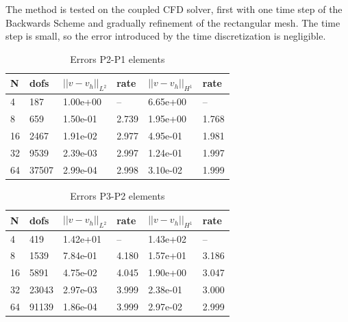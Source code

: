 The method is tested on the coupled CFD solver, first with one time step of the Backwards Scheme and gradually refinement of the rectangular mesh. The time step is small, so the error introduced by the time discretization is negligible.
\begin{table}[!ht]
  \begin{center}
  \begin{tabular}{l | l | l | l | l | l}
    N & dofs &  $||v-v_h||_{L^2}$ & rate & $||v-v_h||_{H^1}$ & rate \\ \hline
     4 &    187 & 1.00e+00 & -- & 6.65e+00 & -- \\ \hline
     8 &    659 & 1.50e-01 & 2.739 & 1.95e+00 & 1.768 \\ \hline
    16 &   2467 & 1.91e-02 & 2.977 & 4.95e-01 & 1.981 \\ \hline
    32 &   9539 & 2.39e-03 & 2.997 & 1.24e-01 & 1.997 \\ \hline
    64 &  37507 & 2.99e-04 & 2.998 & 3.10e-02 & 1.999 \\ \hline
    \hline 
  \end{tabular}
  \caption{Errors P2-P1 elements}
  \end{center}
\end{table}


\begin{table}[!ht]
\begin{center}
  \begin{tabular}{l | l | l | l | l | l}

    N & dofs & $||v-v_h||_{L^2}$ & rate & $||v-v_h||_{H^1}$ & rate \\ \hline
     4 &    419 & 1.42e+01 & -- & 1.43e+02 & -- \\ \hline
     8 &   1539 & 7.84e-01 & 4.180 & 1.57e+01 & 3.186 \\ \hline
    16 &   5891 & 4.75e-02 & 4.045 & 1.90e+00 & 3.047 \\ \hline
    32 &  23043 & 2.97e-03 & 3.999 & 2.38e-01 & 3.000 \\ \hline
    64 &  91139 & 1.86e-04 & 3.999 & 2.97e-02 & 2.999 \\ \hline
    \hline
  \end{tabular}
  \end{center}
  \caption{Errors P3-P2 elements}
\end{table}


